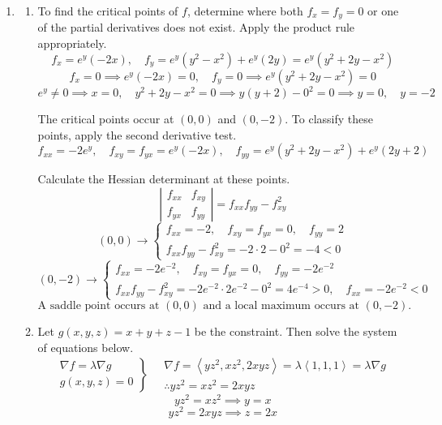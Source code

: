 \documentclass[a4paper, 12pt]{article}
\begin{document}
\begin{enumerate}[leftmargin=*,label=\textbf{\arabic*.}]
\item \begin{enumerate}[leftmargin=*,label=\textbf{\alph*.}]
\item To find the critical points of $f$, determine where both $f_x=f_y=0$ or one of the partial derivatives does not exist. Apply the product rule appropriately.
\[f_x={e}^y(-2x),\quad f_y={e}^y\left(y^2-x^2\right)+{e}^y(2y)={e}^y\left(y^2+2y-x^2\right)\]
\[f_x=0\implies {e}^y(-2x) = 0,\quad f_y=0\implies{e}^y\left(y^2+2y-x^2\right)=0\]
\[{e}^y\neq0\implies x=0,\quad y^2+2y-x^2=0\implies y(y+2)-0^2=0\implies y=0,\quad y=-2\]

The critical points occur at $(0,0)$ and $(0,-2)$. To classify these points, apply the second derivative test.
\[f_{xx}=-2{e}^y,\quad f_{xy}=f_{yx}={e}^y(-2x),\quad f_{yy}={e}^y(y^2+2y-x^2)+{e}^y\left(2y+2\right)\]

Calculate the Hessian determinant at these points.
\[\left|\begin{array}{cc}
f_{xx}&f_{xy}\\
f_{yx}&f_{yy}
\end{array}\right|=f_{xx}f_{yy}-f_{xy}^2\]
\[(0,0)\rightarrow\left\{\begin{array}{l}f_{xx}=-2,\quad f_{xy}=f_{yx}=0,\quad f_{yy}=2\\[1em]
f_{xx}f_{yy}-f_{xy}^2=-2\cdot 2-0^2=-4<0\end{array}\right.\]
\[(0,-2)\rightarrow\left\{\begin{array}{l}f_{xx}=-2{e}^{-2},\quad f_{xy}=f_{yx}=0,\quad f_{yy}=-2{e}^{-2}\\[1em]f_{xx}f_{yy}-f_{xy}^2=-2{e}^{-2}\cdot2{e}^{-2}-0^2=4{e}^{-4}>0,\quad f_{xx}=-2{e}^{-2}<0\end{array}\right.\]
\[\boxed{\text{A saddle point occurs at } (0,0)\text{ and a local maximum occurs at } (0,-2).}\]

\item Let $g(x,y,z)=x+y+z-1$ be the constraint. Then solve the system of equations below.
\[
\left.
\begin{array}{ll}
\displaystyle\nabla f =\lambda \nabla g \\
\displaystyle g(x,y,z) = 0
\end{array}
\right\}\quad
\begin{array}{ll}
\nabla f = \left\langle yz^2,xz^2,2xyz\right\rangle=\lambda\left\langle1,1,1\right\rangle = \lambda\nabla g\\\therefore yz^2=xz^2=2xyz
\end{array}
\]
\[yz^2=xz^2\implies y=x\]
\[yz^2=2xyz\implies z=2x\]


\end{enumerate}
\end{enumerate}
\end{document}
